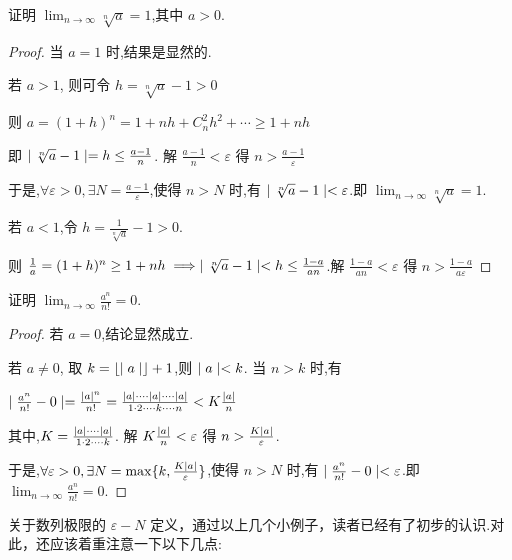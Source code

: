 \begin{example}\label{ex:an}
    证明 $\lim_{n\to \infty}\sqrt[n]{a}=1$,其中 $a>0$.
\end{example}

\begin{proof}
    当 $a=1$ 时,结果是显然的.

    若 $a>1$, 则可令 $h=\sqrt[n]{a}-1>0$

    则 $a=(1+h)^n=1+nh+C_n^2h^2+\cdots\ge 1+nh$

    即 $\mid \sqrt[n]{a}-1 \mid =h \le \frac{a-1}{n}$. 解 $\frac{a-1}{n}<\varepsilon$ 得 $n>\frac{a-1}{\varepsilon}$

    于是,$\forall \varepsilon>0,\exists N=\frac{a-1}{\varepsilon}$,使得 $n>N$ 时,有 $\mid \sqrt[n]{a}-1 \mid<\varepsilon$.即 $\lim_{n\to \infty}\sqrt[n]{a}=1$.

    若 $a<1$,令 $h=\frac{1}{\sqrt[n]{a}}-1>0$.

    则 $\frac{1}{a}=(1+h)^n\ge 1+nh \implies \mid \sqrt[n]{a}-1 \mid<h\le \frac{1-a}{an}$.解 $\frac{1-a}{an}<\varepsilon$ 得 $n>\frac{1-a}{a\varepsilon}$
\end{proof}

\begin{example}\label{ex:ann}
    证明 $\lim_{n\to \infty} \frac{a^n}{n!}=0$.
\end{example}

\begin{proof}
    若 $a=0$,结论显然成立.

    若 $a\ne 0$, 取 $k=\lfloor \mid a \mid \rfloor+1$,则 $\mid a \mid< k$. 当 $n>k$ 时,有

    $\mid \frac{a^n}{n!}-0 \mid=\frac{\mid a \mid^n}{n!}=\frac{\mid a \mid \cdot \cdots \mid a \mid \cdots  \cdot \mid a \mid}{1\cdot 2 \cdots \cdot k \cdots\cdot  n}<K\frac{\mid a \mid}{n}$

    其中,$K=\frac{\mid a \mid \cdot \cdots \mid a \mid }{1\cdot 2 \cdots \cdot k }$. 解 $K\frac{\mid a \mid}{n}<\varepsilon$ 得 $n>\frac{K\mid a \mid}{\varepsilon}$.

    于是,$\forall \varepsilon>0,\exists N=\max \{k,\frac{K\mid a \mid}{\varepsilon}\}$,使得 $n>N$ 时,有 $\mid \frac{a^n}{n!}-0 \mid<\varepsilon$.即 $\lim_{n\to \infty} \frac{a^n}{n!}=0$.
\end{proof}

关于数列极限的 $\varepsilon-N$ 定义，通过以上几个小例子，读者已经有了初步的认识.对此，还应该着重注意一下以下几点:

